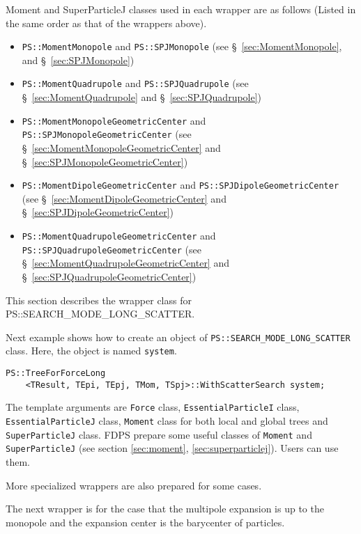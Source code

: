 Moment and SuperParticleJ classes used in each wrapper are as follows (Listed in the same order as that of the wrappers above).
\begin{itemize}[itemsep=-1ex]
\item \texttt{PS::MomentMonopole} and \texttt{PS::SPJMonopole} (see \S~\ref{sec:MomentMonopole}, and \S~\ref{sec:SPJMonopole})
\item \texttt{PS::MomentQuadrupole} and \texttt{PS::SPJQuadrupole} (see \S~\ref{sec:MomentQuadrupole} and \S~\ref{sec:SPJQuadrupole})
\item \texttt{PS::MomentMonopoleGeometricCenter} and \texttt{PS::SPJMonopoleGeometricCenter} (see \S~\ref{sec:MomentMonopoleGeometricCenter} and \S~\ref{sec:SPJMonopoleGeometricCenter})
\item \texttt{PS::MomentDipoleGeometricCenter} and \texttt{PS::SPJDipoleGeometricCenter} (see \S~\ref{sec:MomentDipoleGeometricCenter} and \S~\ref{sec:SPJDipoleGeometricCenter})
\item \texttt{PS::MomentQuadrupoleGeometricCenter} and \texttt{PS::SPJQuadrupoleGeometricCenter} (see \S~\ref{sec:MomentQuadrupoleGeometricCenter} and \S~\ref{sec:SPJQuadrupoleGeometricCenter})
\end{itemize}



This section describes the wrapper class for PS::SEARCH\_MODE\_LONG\_SCATTER.

Next example shows how to create an object of {\tt PS::SEARCH\_MODE\_LONG\_SCATTER} class.  Here, the object is named {\tt system}.

\begin{screen}
\begin{verbatim}
PS::TreeForForceLong
    <TResult, TEpi, TEpj, TMom, TSpj>::WithScatterSearch system;
\end{verbatim}
\end{screen}

The template arguments are {\tt Force} class, {\tt EssentialParticleI} class, {\tt EssentialParticleJ} class, {\tt Moment} class for both local and global trees and {\tt SuperParticleJ} class. FDPS prepare some useful classes of {\tt Moment} and {\tt SuperParticleJ} (see section \ref{sec:moment}, \ref{sec:superparticlej}). Users can use them.

More specialized wrappers are also prepared for some cases.

The next wrapper is for the case that the multipole expansion is up to the monopole and the expansion center is the barycenter of particles.

